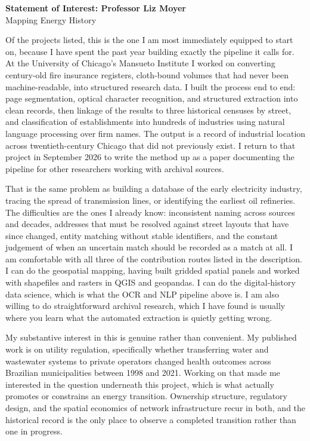 

\begin{center}{\bfseries\large Statement of Interest: Professor Liz Moyer}\\[2pt]
{\small Mapping Energy History}\end{center}
\vspace{6pt}

Of the projects listed, this is the one I am most immediately equipped to start on, because I have spent the past year building exactly the pipeline it calls for. At the University of Chicago's Mansueto Institute I worked on converting century-old fire insurance registers, cloth-bound volumes that had never been machine-readable, into structured research data. I built the process end to end: page segmentation, optical character recognition, and structured extraction into clean records, then linkage of the results to three historical censuses by street, and classification of establishments into hundreds of industries using natural language processing over firm names. The output is a record of industrial location across twentieth-century Chicago that did not previously exist. I return to that project in September 2026 to write the method up as a paper documenting the pipeline for other researchers working with archival sources.

That is the same problem as building a database of the early electricity industry, tracing the spread of transmission lines, or identifying the earliest oil refineries. The difficulties are the ones I already know: inconsistent naming across sources and decades, addresses that must be resolved against street layouts that have since changed, entity matching without stable identifiers, and the constant judgement of when an uncertain match should be recorded as a match at all. I am comfortable with all three of the contribution routes listed in the description. I can do the geospatial mapping, having built gridded spatial panels and worked with shapefiles and rasters in QGIS and geopandas. I can do the digital-history data science, which is what the OCR and NLP pipeline above is. I am also willing to do straightforward archival research, which I have found is usually where you learn what the automated extraction is quietly getting wrong.

My substantive interest in this is genuine rather than convenient. My published work is on utility regulation, specifically whether transferring water and wastewater systems to private operators changed health outcomes across Brazilian municipalities between 1998 and 2021. Working on that made me interested in the question underneath this project, which is what actually promotes or constrains an energy transition. Ownership structure, regulatory design, and the spatial economics of network infrastructure recur in both, and the historical record is the only place to observe a completed transition rather than one in progress.

